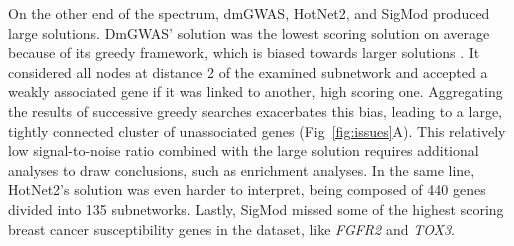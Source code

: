 \documentclass[10pt,letterpaper]{article}
\begin{document}
On the other end of the spectrum, dmGWAS, HotNet2, and SigMod produced large solutions. DmGWAS' solution was the lowest scoring solution on average because of its greedy framework, which is biased towards larger solutions \cite{nikolayeva_network_2018}. It considered all nodes at distance 2 of the examined subnetwork and accepted a weakly associated gene if it was linked to another, high scoring one. Aggregating the results of successive greedy searches exacerbates this bias, leading to a large, tightly connected cluster of unassociated genes (Fig~\ref{fig:issues}A). This relatively low signal-to-noise ratio combined with the large solution requires additional analyses to draw conclusions, such as enrichment analyses. In the same line, HotNet2's solution was even harder to interpret, being composed of 440 genes divided into 135 subnetworks. Lastly, SigMod missed some of the highest scoring breast cancer susceptibility genes in the dataset, like \emph{FGFR2} and \emph{TOX3}.
\end{document}
